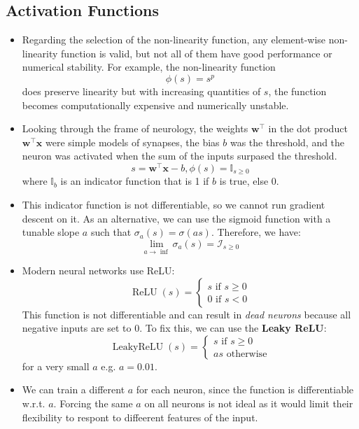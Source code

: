 \documentclass{article}
\newcommand{\tbf}[1]{\textbf{#1}}
\newcommand{\mbf}[1]{\mathbf{#1}}
\begin{document}
        \subsection{Activation Functions}
        \begin{itemize}
            \item Regarding the selection of the non-linearity function, any element-wise non-linearity function is valid, but not all of them have good performance or numerical stability.
            For example, the non-linearity function
            \[\phi(s) = s^p \]
            does preserve linearity but with increasing quantities of $s$, the function becomes computationally expensive and numerically unstable.
            \item Looking through the frame of neurology, the weights $\mbf{w} ^\top$ in the dot product $\mbf{w}^\top \mbf{x}$ were simple models of synapses, the bias $b$ was the threshold, and the neuron was activated when the sum of the inputs surpased the threshold.
            \[s = \mbf{w}^\top \mbf{x} - b, \phi(s) = \mathbb{I}_{s \geq 0}\]
            where $\mathbb{I}_b$ is an indicator function that is 1 if $b$ is true, else 0.
            \item This indicator function is not differentiable, so we cannot run gradient descent on it. As an alternative, we can use the sigmoid function with a tunable slope $a$ such that $\sigma_a(s) = \sigma(as)$. Therefore, we have:
            \[\lim_{a \rightarrow \inf} \sigma _a (s) = \mathcal{I}_{s \geq 0}\]
            \item Modern neural networks use ReLU:
            \[ \operatorname{ReLU}(s) = 
            \begin{cases}
                s \text{ if } s \geq 0 \\
                0 \text{ if } s < 0
            \end{cases} \]
            This function is not differentiable and can result in \emph{dead neurons} because all negative inputs are set to 0. To fix this, we can use the \tbf{Leaky ReLU}:
            \[ \operatorname{LeakyReLU}(s) = 
            \begin{cases}
                s \text{ if } s \geq 0 \\
                as \text{ otherwise}
            \end{cases}\]
            for a very small $a$ e.g. $a = 0.01$.
            \item We can train a different $a$ for each neuron, since the function is differentiable w.r.t. $a$. Forcing the same $a$ on all neurons is not ideal as it would limit their flexibility to respont to diffeerent features of the input.

\end{itemize}
\end{document}
